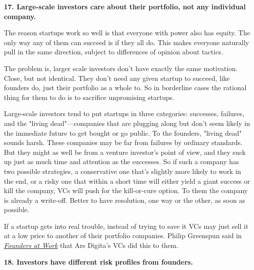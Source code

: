 \textbf{17. Large-scale investors care about their portfolio, not
                    any individual company.}

The reason startups work so well is that everyone
                  with power also has equity. The only way any of them can
                  succeed is if they all do. This makes everyone naturally pull
                  in the same direction, subject to differences of opinion about
                  tactics.

The problem is, larger scale investors
                  don't have exactly the same motivation. Close, but not
                  identical. They don't need any given startup to succeed, like
                  founders do, just their portfolio as a whole to. So in
                  borderline cases the rational thing for them to do is to
                  sacrifice unpromising startups.

Large-scale
                  investors tend to put startups in three categories: successes,
                  failures, and the "living dead"---companies that are
                  plugging along but don't seem likely in the immediate future
                  to get bought or go public. To the founders, "living dead"
                  sounds harsh. These companies may be far from failures by
                  ordinary standards. But they might as well be from a venture
                  investor's point of view, and they suck up just as much time
                  and attention as the successes. So if such a company has two
                  possible strategies, a conservative one that's slightly more
                  likely to work in the end, or a risky one that within a short
                  time will either yield a giant success or kill the company,
                  VCs will push for the kill-or-cure option. To them the company
                  is already a write-off. Better to have resolution, one way or
                  the other, as soon as possible.

If a startup gets
                  into real trouble, instead of trying to save it VCs may just
                  sell it at a low price to another of their portfolio
                  companies. Philip Greenspun said in
                  \href{http://www.amazon.com/gp/product/1590597141}{\emph{Founders at Work}}
                  that Ars Digita's VCs did this to them.

\textbf{18. Investors have different risk profiles from
                    founders.}

